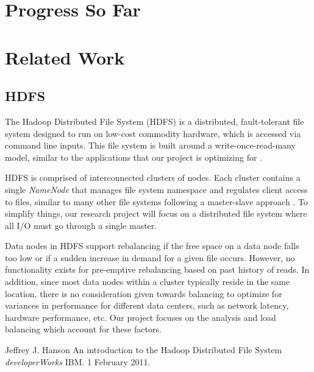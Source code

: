 \documentclass{article}
\begin{document}
\section{Progress So Far}


\section{Related Work}
\subsection{HDFS}
The Hadoop Distributed File System (HDFS) is a distributed, fault-tolerant file system designed to run on low-cost commodity hardware, which is accessed via command line inputs. This file system is built around a write-once-read-many model, similar to the applications that our project is optimizing for \cite{HDFS}.

HDFS is comprised of interconnected clusters of nodes. Each cluster contains a single \emph{NameNode} that manages file system namespace and regulates client access to files, similar to many other file systems following a master-slave approach \cite{HDFS}. To simplify things, our research project will focus on a distributed file system where all I/O must go through a single master. 

Data nodes in HDFS support rebalancing if the free space on a data node falls too low or if a sudden increase in demand for a given file occurs. However, no functionality exists for pre-emptive rebalancing based on past history of reads. In addition, since most data nodes within a cluster typically reside in the same location, there is no consideration given towards balancing to optimize for variances in performance for different data centers, such as network latency, hardware performance, etc. Our project focuses on the analysis and load balancing which account for these factors. 

\newpage
\begin{thebibliography}{10}

 Jeffrey J. Hanson
\newblock An introduction to the Hadoop Distributed File System
\newblock \textit{developerWorks}
\newblock IBM. 1 February 2011. 

\end{thebibliography}
\end{document}
